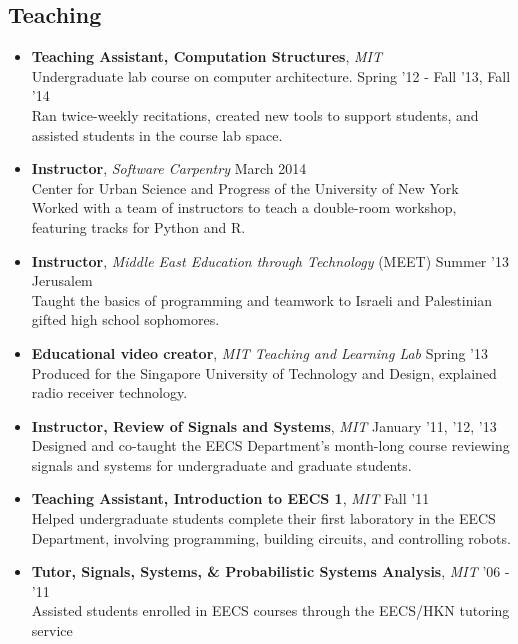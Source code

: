 \documentclass[margin]{res}
\begin{document}
\begin{resume}
\section{Teaching}
\begin{itemize}[leftmargin=*] %
\item {\bf Teaching Assistant, Computation Structures}, {\it MIT} \\Undergraduate lab course on computer architecture. \hfill Spring '12 - Fall '13, Fall '14 \\Ran twice-weekly recitations, created new tools to support students, and assisted students in the course lab space.  
\item {\bf Instructor}, {\it Software Carpentry} \hfill March 2014 \\ 
Center for Urban Science and Progress of the University of New York
\\Worked with a team of instructors to teach a double-room workshop, featuring tracks for Python and R.
\item {\bf Instructor}, {\it Middle East Education through Technology} (MEET) \hfill Summer '13 \\ Jerusalem  \\ Taught the basics of programming and teamwork to Israeli and Palestinian gifted high school sophomores.
\item {\bf Educational video creator}, {\it MIT Teaching and Learning Lab} \hfill Spring '13 \\
Produced for the Singapore University of Technology and Design, explained radio receiver technology.
\item {\bf Instructor, Review of Signals and Systems}, {\it MIT} \hfill January '11, '12, '13 \\Designed and co-taught the EECS Department's month-long course reviewing signals and systems for undergraduate and graduate students.
\item {\bf Teaching Assistant, Introduction to EECS 1}, {\it MIT} \hfill Fall '11 \\ Helped undergraduate students complete their first laboratory in the EECS Department, involving programming, building circuits, and controlling robots.

\item {\bf Tutor, Signals, Systems, \& Probabilistic Systems Analysis}, {\it MIT} \hfill '06 - '11 \\ Assisted students enrolled in EECS courses through the EECS/HKN tutoring service  
\end{itemize}





\end{resume}
\end{document}
